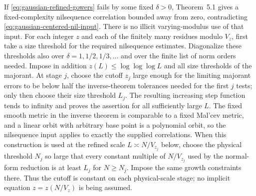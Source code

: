 \documentclass[11pt]{article}
\theoremstyle{definition}
\theoremstyle{remark}
\begin{document}
If \eqref{eq:gaussian-refined-gowers} fails by some fixed $\delta>0$,
Theorem~5.1 gives a fixed-complexity nilsequence correlation bounded
away from zero, contradicting \eqref{eq:gaussian-centered-nil-input}.
There is no illicit varying-modulus use of that input. For each integer
$z$ and each of the finitely many residues modulo $V_z$, first take a
size threshold for the required nilsequence estimates. Diagonalize
these thresholds also over $\delta=1,1/2,1/3,\ldots$ and over the finite
list of norm orders needed. Impose in addition
$z(L)\leq\log\log\log L$ and all size thresholds of the majorant.
At stage $j$, choose the cutoff $z_j$ large enough for the limiting
majorant errors to be below half the inverse-theorem tolerances needed
for the first $j$ tests; only then choose their size threshold $L_j$.
The resulting increasing step function tends to infinity and proves
the assertion for all sufficiently large $L$. The fixed smooth metric
in the inverse theorem is comparable to a fixed Mal'cev metric, and a
linear orbit with arbitrary base point is a polynomial orbit, so the
nilsequence input applies to exactly the supplied correlations.
When this construction is used at the refined scale $L\asymp N/V_{z_j}$
below, choose the physical threshold $N_j$ so large that every constant
multiple of $N/V_{z_j}$ used by the normal-form reduction is at least
$L_j$ for $N\geq N_j$. Impose the same growth constraints there.
Thus the cutoff is constant on each physical-scale stage; no implicit
equation $z=z(N/V_z)$ is being assumed.
\end{document}
